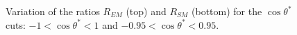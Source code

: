 \begin{figure}[h]
\begin{center}
  \caption{ Variation of the ratios $R_{EM}$ (top) and $R_{SM}$ (bottom) for the $\cos\theta^*$ cuts:
           $-1 < \cos\theta^* < 1$ and  $-0.95 < \cos\theta^* < 0.95$. }
  \label{fig:ratios_cc_syst}
 \end{center}
\end{figure} 


















